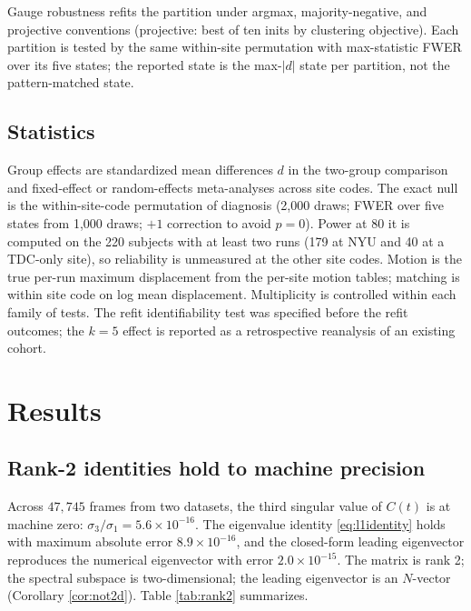 \documentclass[11pt]{article}
\theoremstyle{definition}
\begin{document}
Gauge robustness refits the partition under argmax, majority-negative, and projective
conventions (projective: best of ten inits by clustering objective). Each partition is
tested by the same within-site permutation with max-statistic FWER over its five states;
the reported state is the max-$|d|$ state per partition, not the pattern-matched state.

\subsection{Statistics}
Group effects are standardized mean differences $d$ in the two-group comparison and
fixed-effect or random-effects meta-analyses across site codes. The exact null is the
within-site-code permutation of diagnosis (2,000 draws; FWER over five states from
1,000 draws; $+1$ correction to avoid $p=0$). Power at 80%
it is computed on the 220 subjects with at least two runs (179 at NYU and 40 at a
TDC-only site), so reliability is unmeasured at the other site codes. Motion is the true
per-run maximum displacement from the per-site motion tables; matching is within site
code on log mean displacement. Multiplicity is controlled within each family of tests.
The refit identifiability test was specified before the refit outcomes; the $k=5$ effect
is reported as a retrospective reanalysis of an existing cohort.

\section{Results}
\label{sec:results}

\subsection{Rank-2 identities hold to machine precision}
Across $47{,}745$ frames from two datasets, the third singular value of $C(t)$ is at
machine zero: $\sigma_3/\sigma_1=5.6\times10^{-16}$. The eigenvalue identity
\eqref{eq:l1identity} holds with maximum absolute error $8.9\times10^{-16}$, and the
closed-form leading eigenvector reproduces the numerical eigenvector with error
$2.0\times10^{-15}$. The matrix is rank 2; the spectral subspace is two-dimensional;
the leading eigenvector is an $N$-vector (Corollary \ref{cor:not2d}). Table
\ref{tab:rank2} summarizes.
\end{document}
